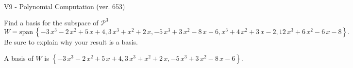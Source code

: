 \begin{exercise}
  \begin{exerciseTitle}V9 - Polynomial Computation (ver. 653)\end{exerciseTitle}
  \begin{exerciseStatement}
    Find a basis for the subspace of \(\mathcal{P}^3\) 
\[W=\mathrm{span}\ \left\{-3 \, x^{3} - 2 \, x^{2} + 5 \, x + 4 , 3 \, x^{3} + x^{2} + 2 \, x , -5 \, x^{3} + 3 \, x^{2} - 8 \, x - 6 , x^{3} + 4 \, x^{2} + 3 \, x - 2 , 12 \, x^{3} + 6 \, x^{2} - 6 \, x - 8\right\}.\]
 Be sure to explain why your result is a basis.


  \end{exerciseStatement}
  \begin{exerciseAnswer}
   A basis of \(W\) is  \(\left\{-3 \, x^{3} - 2 \, x^{2} + 5 \, x + 4 , 3 \, x^{3} + x^{2} + 2 \, x , -5 \, x^{3} + 3 \, x^{2} - 8 \, x - 6\right\}\).
  


  \end{exerciseAnswer}
\end{exercise}